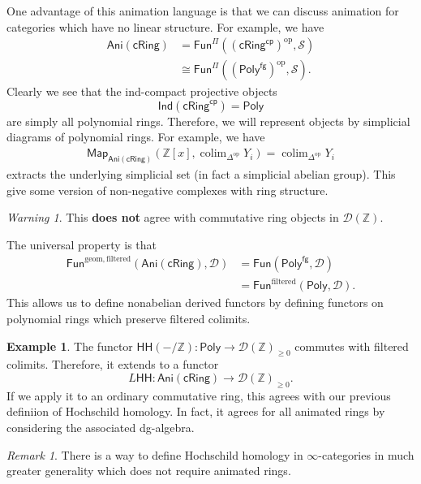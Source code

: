 \documentclass[10pt, oneside]{memoir}
\theoremstyle{definition}
\newtheorem{exm}[thm]{Example}
\theoremstyle{remark}
\newtheorem{rmk}[thm]{Remark}
\newtheorem{warn}[thm]{Warning}
\theoremstyle{plain}
\theoremstyle{definition}
\theoremstyle{remark}
\newcommand{\Z}{\mathbb{Z}}
\newcommand{\mc}[1]{\mathcal{#1}}
\newcommand{\mr}[1]{\mathrm{#1}}
\newcommand{\ms}[1]{\mathsf{#1}}
\newcommand{\1}{\mathbf{1}}
\newcommand{\2}{\mathbf{2}}
\newcommand{\3}{\mathbf{3}}
\newcommand{\HH}{\ms{HH}}
\DeclareMathOperator{\op}{op}
\DeclareMathOperator*{\colim}{colim}
\begin{document}
One advantage of this animation language is that we can discuss animation for categories which have no linear structure. For example, we have
\begin{align*}
    \ms{Ani}(\ms{cRing}) &= \ms{Fun}^{\Pi} ((\ms{cRing}^{\ms{cp}})^{\op}, \mc{S}) \\
    &\cong \ms{Fun}^{\Pi}((\ms{Poly}^{\ms{fg}})^{\op}, \mc{S}).
\end{align*}
Clearly we see that the ind-compact projective objects
\[ \ms{Ind}(\ms{cRing}^{\ms{cp}}) = \ms{Poly} \]
are simply all polynomial rings. Therefore, we will represent objects by simplicial diagrams of polynomial rings. For example, we have
\begin{align*}
    \ms{Map}_{\ms{Ani}(\ms{cRing})}(\Z[x], \colim_{\Delta^{\op}} Y_i) = \colim_{\Delta^{\op}} Y_i
\end{align*}
extracts the underlying simplicial set (in fact a simplicial abelian group). This give some version of non-negative complexes with ring structure.

\begin{warn}
    This \textbf{does not} agree with commutative ring objects in \(\mc{D}(\Z) \).
\end{warn}

The universal property is that
\begin{align*}
    \ms{Fun}^{\mr{geom,filtered}}(\ms{Ani}(\ms{cRing}), \mc{D}) &= \ms{Fun}(\ms{Poly}^{\ms{fg}}, \mc{D}) \\
    &= \ms{Fun}^{\mr{filtered}}(\ms{Poly}, \mc{D}).
\end{align*}
This allows us to define nonabelian derived functors by defining functors on polynomial rings which preserve filtered colimits.

\begin{exm}
    The functor \(\HH(-/\Z) \colon \ms{Poly} \to \mc{D}(\Z)_{\geq 0} \) commutes with filtered colimits. Therefore, it extends to a functor
    \[ L\HH \colon \ms{Ani}(\ms{cRing}) \to \mc{D}(\Z)_{\geq 0}. \]
    If we apply it to an ordinary commutative ring, this agrees with our previous definiion of Hochschild homology. In fact, it agrees for all animated rings by considering the associated dg-algebra.
\end{exm}

\begin{rmk}
    There is a way to define Hochschild homology in \(\infty \)-categories in much greater generality which does not require animated rings.
\end{rmk}
\end{document}
